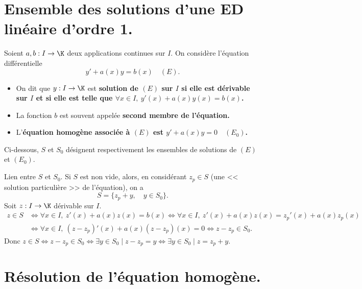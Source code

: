 \documentclass[11pt]{article}
\begin{document}


\thispagestyle{fancy}

\section{Ensemble des solutions d'une ED linéaire d'ordre 1.}

\begin{defi}{}{}
    Soient $a,b:I\to\K$ deux applications continues sur $I$. On considère l'équation différentielle
    \begin{equation*}
        y'+a(x)y=b(x) \quad (E).
    \end{equation*}
    \begin{itemize}
        \item On dit que $y:I\to\K$ est \bf{solution} de $(E)$ sur $I$ si elle est dérivable sur $I$ et si elle est telle que $\forall x \in I, ~ y'(x)+a(x)y(x)=b(x)$.
        \item La fonction $b$ est souvent appelée \bf{second membre} de l'équation.
        \item L'\bf{équation homogène} associée à $(E)$ est $y'+a(x)y=0 \quad (E_0)$.
    \end{itemize}
\end{defi}

Ci-dessous, $S$ et $S_0$ désignent respectivement les ensembles de solutions de $(E)$ et $(E_0)$.

\begin{prop}{Lien entre $S$ et $S_0$.}{}
    Si $S$ est non vide, alors, en considérant $z_p\in S$ (une << solution particulière >> de l'équation), on a
    \begin{equation*}
        S=\{z_p + y, \quad y \in S_0\}.
    \end{equation*}
    \tcblower
    Soit $z:I\to\K$ dérivable sur $I$.
    \begin{align*}
        z\in S &\iff \forall x \in I, ~ z'(x)+a(x)z(x)=b(x) \iff \forall x \in I, ~ z'(x) +a(x)z(x)=z_p'(x)+a(x)z_p(x)\\
        &\iff \forall x \in I, ~ (z-z_p)'(x)+a(x)(z-z_p)(x)=0 \iff z-z_p \in S_0.
    \end{align*}
    Donc $z\in S \iff z-z_p \in S_0 \iff \exists y \in S_0 \mid z - z_p = y \iff \exists y\in S_0 \mid z = z_p + y$.
\end{prop}

\section{Résolution de l'équation homogène.}
\end{document}
